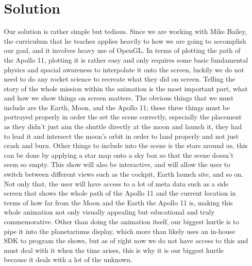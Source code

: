 \documentclass[10pt,a4paper,oneside,onecolumn, english]{IEEEtran}
\begin{document}
\section{Solution}
Our solution is rather simple but tedious. Since we are working with Mike Bailey, the curriculum that he teaches applies heavily to how we are going to accomplish our goal, and it involves heavy use of OpenGL. In terms of plotting the path of the Apollo 11, plotting it is rather easy and only requires some basic fundamental physics and spacial awareness to interpolate it onto the screen, luckily we do not need to do any rocket science to recreate what they did on screen. Telling the story of the whole mission within the animation is the most important part, what and how we show things on screen matters. The obvious things that we must include are the Earth, Moon, and the Apollo 11; these three things must be portrayed properly in order the set the scene correctly, especially the placement as they didn't just aim the shuttle directly at the moon and launch it, they had to lead it and intersect the moon's orbit in order to land properly and not just crash and burn. Other things to include into the scene is the stars around us, this can be done by applying a star map onto a sky box so that the scene doesn't seem so empty. This show will also be interactive, and will allow the user to switch between different views such as the cockpit, Earth launch site, and so on. Not only that, the user will have access to a lot of meta data such as a side screen that shows the whole path of the Apollo 11 and the current location in terms of how far from the Moon and the Earth the Apollo 11 is, making this whole animation not only visually appealing but educational and truly commemorative. Other than doing the animation itself, our biggest hurtle is to pipe it into the planetariums display, which more than likely uses an in-house SDK to program the shows, but as of right now we do not have access to this and must deal with it when the time arises, this is why it is our biggest hurtle because it deals with a lot of the unknown.
\end{document}
